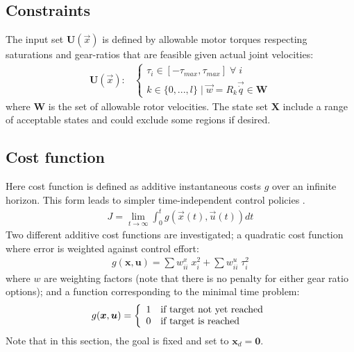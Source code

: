 \subsection{Constraints}

The input set $\boldsymbol{U}(\vec{x})$ is defined by allowable motor torques respecting saturations and gear-ratios that are feasible given actual joint velocities:
\begin{align}
	\boldsymbol{U}(\vec{x}):&\left\{
	\begin{array}{l}
	\tau_i \in [ -\tau_{max} , \tau_{max} ] \;\forall\; i\\
	 k      \in \{ 0 , ... , l \} \; | \; \vec{w} = R_k \vec{\dot{q}} \in \boldsymbol{W} 
	\end{array}
	\right.
\end{align}
where $\boldsymbol{W}$ is the set of allowable rotor velocities. The state set $\boldsymbol{X}$ include a range of acceptable states and could exclude some regions if desired. 

\subsection{Cost function}
\label{sec:CostFunction}

Here cost function is defined as additive instantaneous costs $g$ over an infinite horizon. This form leads to simpler time-independent control policies \cite{bertsekas_dynamic_2000}.
%
\begin{align}
	J = \lim_{ t \rightarrow \infty} \int_0^t g(\vec{x}(t),\vec{u}(t)) dt 
	\label{eq:j_lim}
\end{align}
%
Two different additive cost functions are investigated; a quadratic cost function where error is weighted against control effort:
%
\begin{align}
	g(\boldsymbol{x},\boldsymbol{u}) = \sum w^x_{ii} \; x_i^2 + \sum w^u_{ii} \; \tau_i^2
	\label{eq:g_quad}
\end{align}
%
where $w$ are weighting factors (note that there is no penalty for either gear ratio options); and a function corresponding to the minimal time problem:
%
\begin{align}
	g(\boldsymbol{x},\boldsymbol{u}) = \left \{ \begin{array}[pos]{l}	1 \quad   \text{if target not yet reached} \\ 0 \quad   \text{if target is reached} \end{array}  \right.
	\label{eq:g_time}
\end{align}
%
Note that in this section, the goal is fixed and set to $\boldsymbol{x}_d=\boldsymbol{0}$.


